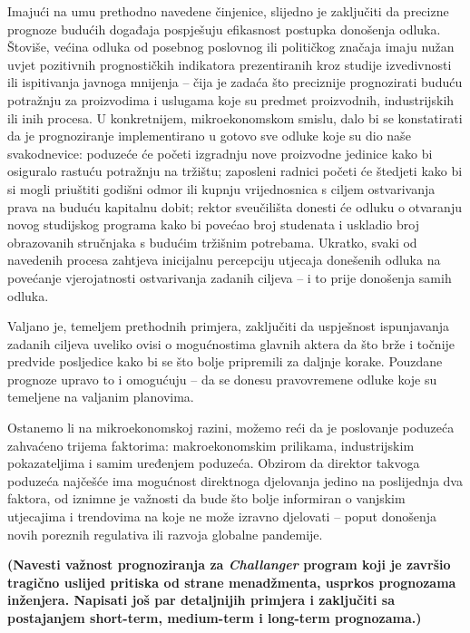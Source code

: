 \documentclass[a4paper,12pt,oneside]{memoir}
\begin{document}
        Imajući na umu prethodno navedene činjenice, slijedno je zaključiti da precizne prognoze budućih događaja pospješuju efikasnost postupka donošenja odluka. Štoviše, većina odluka od posebnog poslovnog ili političkog značaja imaju nužan uvjet pozitivnih prognostičkih indikatora prezentiranih kroz studije izvedivnosti ili ispitivanja javnoga mnijenja -- čija je zadaća što preciznije prognozirati buduću potražnju za proizvodima i uslugama koje su predmet proizvodnih, industrijskih ili inih procesa. U konkretnijem, mikroekonomskom smislu, dalo bi se konstatirati da je prognoziranje implementirano u gotovo sve odluke koje su dio naše svakodnevice: poduzeće će početi izgradnju nove proizvodne jedinice kako bi osiguralo rastuću potražnju na tržištu; zaposleni radnici početi će štedjeti kako bi si mogli priuštiti godišni odmor ili kupnju vrijednosnica s ciljem ostvarivanja prava na buduću kapitalnu dobit; rektor sveučilišta donesti će odluku o otvaranju novog studijskog programa kako bi povećao broj studenata i uskladio broj obrazovanih stručnjaka s budućim tržišnim potrebama. Ukratko, svaki od navedenih procesa zahtjeva inicijalnu percepciju utjecaja donešenih odluka na povećanje vjerojatnosti ostvarivanja zadanih ciljeva -- i to prije donošenja samih odluka.

        Valjano je, temeljem prethodnih primjera, zaključiti da uspješnost ispunjavanja zadanih ciljeva uveliko ovisi o mogućnostima glavnih aktera da što brže i točnije predvide posljedice kako bi se što bolje pripremili za daljnje korake. Pouzdane prognoze upravo to i omogućuju -- da se donesu pravovremene odluke koje su temeljene na valjanim planovima.

        Ostanemo li na mikroekonomskoj razini, možemo reći da je poslovanje poduzeća zahvaćeno trijema faktorima: makroekonomskim prilikama, industrijskim pokazateljima i samim uređenjem poduzeća. Obzirom da direktor takvoga poduzeća najčešće ima mogućnost direktnoga djelovanja jedino na poslijednja dva faktora, od iznimne je važnosti da bude što bolje informiran o vanjskim utjecajima i trendovima na koje ne može izravno djelovati -- poput donošenja novih poreznih regulativa ili razvoja globalne pandemije.

        
        \textbf{(Navesti važnost prognoziranja za \textit{Challanger} program koji je završio tragično uslijed pritiska od strane menadžmenta, usprkos prognozama inženjera. Napisati još par detaljnijih primjera i zaključiti sa postajanjem short-term, medium-term i long-term prognozama.)}
\end{document}
